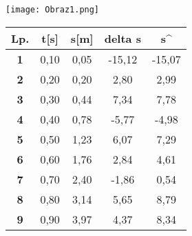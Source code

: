 \documentclass[11.5pt, arev]{article}
\begin{document}
\begin{center}

\centering
\texttt{[image: Obraz1.png]}

\centering
\begin{table}[]
\centering
\begin{tabular}{|c|cccc}
\hline
Lp. & \multicolumn{1}{c|}{\textbf{t{[}s{]}}} & \multicolumn{1}{c|}{\textbf{s{[}m{]}}} & \multicolumn{1}{c|}{\textbf{delta s}} & \multicolumn{1}{c|}{\textbf{s\textasciicircum{}}} \\ \hline
\textbf{1}  & 0,10                                   & 0,05                                   & -15,12                                & -15,07                                            \\ \cline{1-1}
\textbf{2}  & 0,20                                   & 0,20                                   & 2,80                                  & 2,99                                              \\ \cline{1-1}
\textbf{3}  & 0,30                                   & 0,44                                   & 7,34                                  & 7,78                                              \\ \cline{1-1}
\textbf{4}  & 0,40                                   & 0,78                                   & -5,77                                 & -4,98                                             \\ \cline{1-1}
\textbf{5}  & 0,50                                   & 1,23                                   & 6,07                                  & 7,29                                              \\ \cline{1-1}
\textbf{6}  & 0,60                                   & 1,76                                   & 2,84                                  & 4,61                                              \\ \cline{1-1}
\textbf{7}  & 0,70                                   & 2,40                                   & -1,86                                 & 0,54                                              \\ \cline{1-1}
\textbf{8}  & 0,80                                   & 3,14                                   & 5,65                                  & 8,79                                              \\ \cline{1-1}
\textbf{9}  & 0,90                                   & 3,97                                   & 4,37                                  & 8,34                                              \\ \cline{1-1}

\end{tabular}
\end{table}
\end{center}
\end{document}
